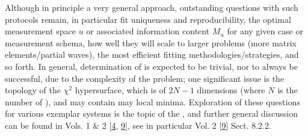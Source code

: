 \documentclass[letterpaper,table,10pt,english]{jupyterBook}
\begin{document}
\sphinxAtStartPar
Although in principle a very general approach, outstanding questions with such protocols remain, in particular fit uniqueness and reproducibility, the optimal measurement space \(u\) \sphinxhyphen{} or associated information content \(M_u\) \sphinxhyphen{} for any given case or measurement schema, how well they will scale to larger problems (more matrix elements/partial waves), the most efficient fitting methodologies/strategies, and so forth. In general, determination of {\hyperref[\detokenize{backmatter/glossary:term-radial-matrix-elements}]{}} is  expected to be trivial, nor to always be successful, due to the complexity of the problem; one significant issue is the topology of the \(\chi^2\) hypersurface, which is of \(2N-1\) dimensions (where \(N\) is the number of {\hyperref[\detokenize{backmatter/glossary:term-radial-matrix-elements}]{}}), and may contain may local minima. Exploration of these questions for various exemplar systems is the topic of the {\hyperref[\detokenize{part2/extracting_matrix_elements_overview_270423:chpt-extracting-matrix-elements-overview}]{}}, and further general discussion can be found in  Vols. 1 \& 2 {[}\hyperlink{cite.backmatter/bibliography:id675}{4}, \hyperlink{cite.backmatter/bibliography:id676}{9}{]}, see in particular  Vol. 2 {[}\hyperlink{cite.backmatter/bibliography:id676}{9}{]} Sect. 8.2.2.
\end{document}
